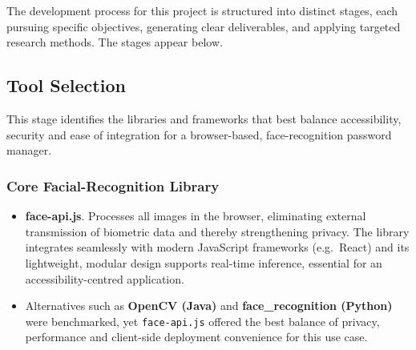 
\chapter{}%
\label{ch:methodologie}

The development process for this project is structured into distinct stages, each pursuing specific objectives, generating clear deliverables, and applying targeted research methods. The stages appear below.

\section{Tool Selection}
This stage identifies the libraries and frameworks that best balance accessibility, security and ease of integration for a browser-based, face-recognition password manager.

\subsection*{Core Facial-Recognition Library}
\begin{itemize}
  \item \textbf{face-api.js}. Processes all images in the browser, eliminating external transmission of biometric data and thereby strengthening privacy. The library integrates seamlessly with modern JavaScript frameworks (e.g.\ React) and its lightweight, modular design supports real-time inference, essential for an accessibility-centred application.
  \item Alternatives such as \textbf{OpenCV (Java)} and \textbf{face\_recognition (Python)} were benchmarked, yet \texttt{face-api.js} offered the best balance of privacy, performance and client-side deployment convenience for this use case.
\end{itemize}

